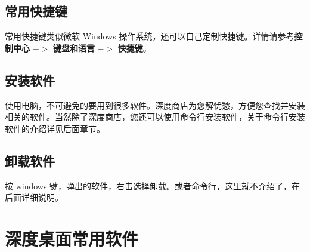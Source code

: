 \documentclass[doctor,openright,twoside]{sjtuthesis}
\theoremstyle{plain}
\theoremstyle{definition}
\theoremstyle{remark}
\theoremstyle{ocrenumbox}
\theoremstyle{plain}
\begin{document}
\hypertarget{section-25}{%
\subsection{常用快捷键}\label{section-25}}

常用快捷键类似微软 Windows 操作系统，还可以自己定制快捷键。详情请参考\textbf{控制中心} \(->\) \textbf{键盘和语言} \(->\) \textbf{快捷键}。

\hypertarget{section-26}{%
\subsection{安装软件}\label{section-26}}

使用电脑，不可避免的要用到很多软件。深度商店为您解忧愁，方便您查找并安装相关的软件。当然除了深度商店，您还可以使用命令行安装软件，关于命令行安装软件的介绍详见后面章节。


\hypertarget{section-27}{%
\subsection{卸载软件}\label{section-27}}

按 windows 键，弹出的软件，右击选择卸载。或者命令行，这里就不介绍了，在后面详细说明。

\hypertarget{section-28}{%
\section{深度桌面常用软件}\label{section-28}}
\end{document}
